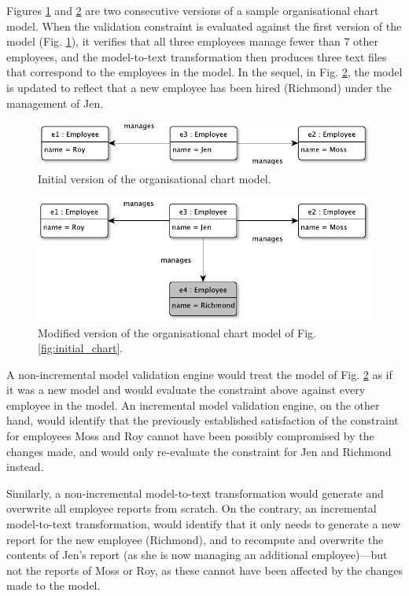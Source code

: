 \documentclass[12pt, a4paper]{report} \usepackage[titletoc]{appendix}
\begin{document}
Figures \ref{fig:initial_chart_0} and \ref{fig:modified_chart} are two consecutive versions of a sample organisational chart model. When the validation constraint is evaluated against the first version of the model (Fig. \ref{fig:initial_chart_0}), it verifies that all three employees manage fewer than 7 other employees, and the model-to-text transformation then produces three text files that correspond to the employees in the model. In the sequel, in Fig. \ref{fig:modified_chart}, the model is updated to reflect that a new employee has been hired (Richmond) under the management of Jen. 

\begin{figure}[ht]
	\centering
	\includegraphics[width=\linewidth]{initial_chart_0}
	\caption{Initial version of the organisational chart model.}
	\label{fig:initial_chart_0}
\end{figure}

\begin{figure}[ht]
	\centering
	\includegraphics[width=\linewidth]{modified_chart}
	\caption{Modified version of the organisational chart model of Fig. \ref{fig:initial_chart}.}
	\label{fig:modified_chart}
\end{figure}

A non-incremental model validation engine would treat the model of Fig. \ref{fig:modified_chart} as if it was a new model and would evaluate the constraint above against every employee in the model. An incremental model validation engine, on the other hand, would identify that the previously established satisfaction of the constraint for employees Moss and Roy cannot have been possibly compromised by the changes made, and would only re-evaluate the constraint for Jen and Richmond instead. 

Similarly, a non-incremental model-to-text transformation would generate and overwrite all employee reports from scratch. On the contrary, an incremental model-to-text transformation, would identify that it only needs to generate a new report for the new employee (Richmond), and to recompute and overwrite the contents of Jen's report (as she is now managing an additional employee)---but not the reports of Moss or Roy, as these cannot have been affected by the changes made to the model.
\end{document}
